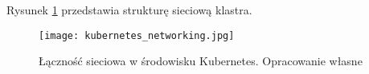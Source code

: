 Rysunek \ref{fig:kubernetes-networking} przedstawia strukturę sieciową klastra.

\begin{figure}[h]
  \centering
  \texttt{[image: kubernetes\_networking.jpg]}
  \caption{Łączność sieciowa w środowisku Kubernetes. Opracowanie własne}
  \label{fig:kubernetes-networking}
\end{figure}